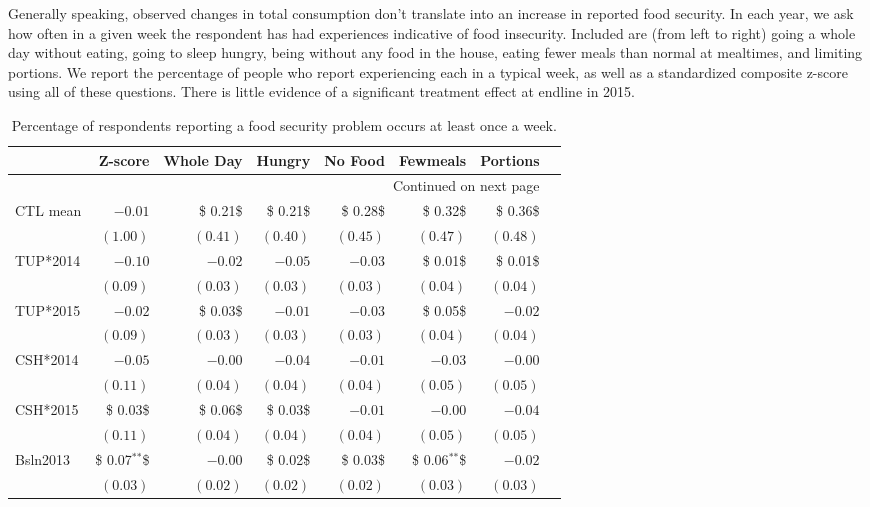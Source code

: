 \documentclass[12pt,article]{article}
\begin{document}
Generally speaking, observed changes in total consumption don't translate into an
increase in reported food security. In each year, we ask how often in a given week
the respondent has had experiences indicative of food insecurity. Included are (from
left to right) going a whole day without eating, going to sleep hungry, being without
any food in the house, eating fewer meals than normal at mealtimes, and limiting
portions. We report the percentage of people who report experiencing each in a
typical week, as well as a standardized composite z-score using all of these
questions. There is little evidence of a significant treatment effect at endline
in 2015.

\begin{longtable}{lrrrrrrr}
\caption{\label{tab:foodsecure}Percentage of respondents reporting a food security problem occurs at least once a week.}
\\
\hline
 & Z-score & Whole Day & Hungry & No Food & Fewmeals & Portions\\
\hline
\endhead
\hline\multicolumn{7}{r}{Continued on next page} \\
\endfoot
\endlastfoot
CTL mean & $-0.01$ & \$ 0.21\$ & \$ 0.21\$ & \$ 0.28\$ & \$ 0.32\$ & \$ 0.36\$\\
 & $( 1.00)$ & $( 0.41)$ & $( 0.40)$ & $( 0.45)$ & $( 0.47)$ & $( 0.48)$\\
\hline
TUP*2014 & $-0.10$ & $-0.02$ & $-0.05$ & $-0.03$ & \$ 0.01\$ & \$ 0.01\$\\
 & $( 0.09)$ & $( 0.03)$ & $( 0.03)$ & $( 0.03)$ & $( 0.04)$ & $( 0.04)$\\
TUP*2015 & $-0.02$ & \$ 0.03\$ & $-0.01$ & $-0.03$ & \$ 0.05\$ & $-0.02$\\
 & $( 0.09)$ & $( 0.03)$ & $( 0.03)$ & $( 0.03)$ & $( 0.04)$ & $( 0.04)$\\
CSH*2014 & $-0.05$ & $-0.00$ & $-0.04$ & $-0.01$ & $-0.03$ & $-0.00$\\
 & $( 0.11)$ & $( 0.04)$ & $( 0.04)$ & $( 0.04)$ & $( 0.05)$ & $( 0.05)$\\
CSH*2015 & \$ 0.03\$ & \$ 0.06\$ & \$ 0.03\$ & $-0.01$ & $-0.00$ & $-0.04$\\
 & $( 0.11)$ & $( 0.04)$ & $( 0.04)$ & $( 0.04)$ & $( 0.05)$ & $( 0.05)$\\
Bsln2013 & \$ 0.07$^{\text{**}}$\$ & $-0.00$ & \$ 0.02\$ & \$ 0.03\$ & \$ 0.06$^{\text{**}}$\$ & $-0.02$\\
 & $( 0.03)$ & $( 0.02)$ & $( 0.02)$ & $( 0.02)$ & $( 0.03)$ & $( 0.03)$\\

\end{longtable}
\end{document}
